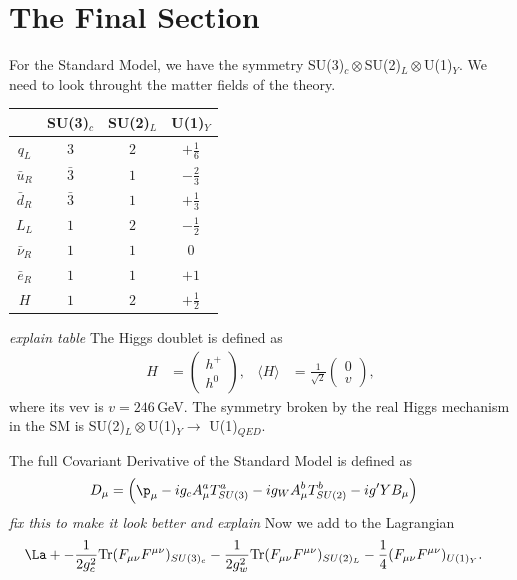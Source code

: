 \documentclass[relqm.tex]{subfiles}
\begin{document}
\section{The Final Section}
For the Standard Model, we have the symmetry SU(3)$_c\otimes$SU(2)$_L\otimes$U(1)$_Y$.
We need to look throught the matter fields of the theory. 
\begin{table}[H]
    \centering
    \begin{tabular}{c|ccc}
        \hline\hline
        \rowcolor{lightgray} & SU(3)$_c$ & SU(2)$_L$ & U(1)$_Y$ \\
        \hline\hline
        $q_L$ & $3$ & $2$ & $+\frac16$ \\ 
        $\bar{u}_R$ & $\bar{3}$ & $1$ & $-\frac23$ \\
        $\bar{d}_R$ & $\bar{3}$ & $1$ & $+\frac13$ \\
        $L_L$ & $1$ & $2$ & $-\frac12$ \\
        $\bar{\nu}_R$ & $1$ & $1$ & $0$ \\
        $\bar{e}_R$ & $1$ & $1$ & $+1$ \\
        \hline 
        $H$ & $1$ & $2$ & $+\frac12$ \\
        \hline\hline
    \end{tabular}
\end{table}
\emph{explain table}
The Higgs doublet is defined as
\begin{align}
    H &= \begin{pmatrix} h^+ \\ h^0\end{pmatrix}, & \langle H\rangle &= \frac{1}{\sqrt{2}}\begin{pmatrix} 0 \\ v\end{pmatrix},
\end{align}
where its vev is $v=246\,$GeV.
The symmetry broken by the real Higgs mechanism in the SM is SU(2)$_L\otimes$U(1)$_Y\to$ U(1)$_{QED}$.

The full Covariant Derivative of the Standard Model is defined as
\begin{align}
    D_\mu &= \left(\p_\mu - ig_cA^a_\mu T^a_{SU(3)} - ig_WA_\mu^bT^b_{SU(2)} - ig'YB_\mu\right) 
\end{align}
\emph{fix this to make it look better and explain}
Now we add to the Lagrangian
\begin{align}
    \La &+ -\frac{1}{2g_c^2}\text{Tr}(F_{\mu\nu}F^{\mu\nu})_{SU(3)_c} - \frac{1}{2g_w^2}\text{Tr}(F_{\mu\nu}F^{\mu\nu})_{SU(2)_L} - \frac14(F_{\mu\nu}F^{\mu\nu})_{U(1)_Y}.
\end{align}
\end{document}
